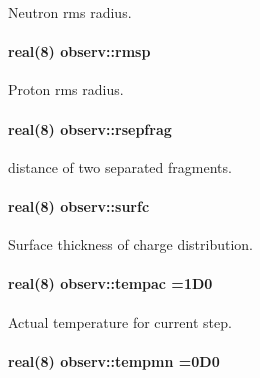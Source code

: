 Neutron rms radius. 

\paragraph[{\texorpdfstring{rmsp}{rmsp}}]{\setlength{\rightskip}{0pt plus 5cm}real(8) observ\+::rmsp}\hypertarget{namespaceobserv_a16ce4982fb88de7727f5d9e0fc731ad7}{}\label{namespaceobserv_a16ce4982fb88de7727f5d9e0fc731ad7}


Proton rms radius. 

\paragraph[{\texorpdfstring{rsepfrag}{rsepfrag}}]{\setlength{\rightskip}{0pt plus 5cm}real(8) observ\+::rsepfrag}\hypertarget{namespaceobserv_a54e2e97adacbf83b5bbd1d6836ae5a9e}{}\label{namespaceobserv_a54e2e97adacbf83b5bbd1d6836ae5a9e}


distance of two separated fragments. 

\paragraph[{\texorpdfstring{surfc}{surfc}}]{\setlength{\rightskip}{0pt plus 5cm}real(8) observ\+::surfc}\hypertarget{namespaceobserv_a0c3e68d8ecea5ff3171ecea1551e1bb1}{}\label{namespaceobserv_a0c3e68d8ecea5ff3171ecea1551e1bb1}


Surface thickness of charge distribution. 

\paragraph[{\texorpdfstring{tempac}{tempac}}]{\setlength{\rightskip}{0pt plus 5cm}real(8) observ\+::tempac =1\+D0}\hypertarget{namespaceobserv_a70b4ab331c460ccbbad144d552722744}{}\label{namespaceobserv_a70b4ab331c460ccbbad144d552722744}


Actual temperature for current step. 

\paragraph[{\texorpdfstring{tempmn}{tempmn}}]{\setlength{\rightskip}{0pt plus 5cm}real(8) observ\+::tempmn =0\+D0}\hypertarget{namespaceobserv_a992f70652154733395ffdab398549239}{}\label{namespaceobserv_a992f70652154733395ffdab398549239}


